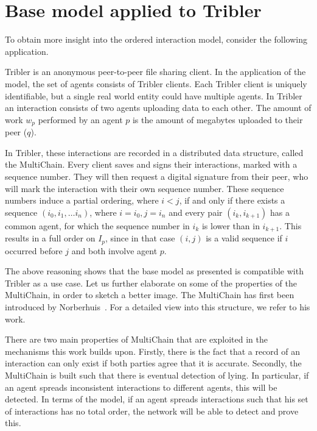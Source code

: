 \documentclass[a4paper,11pt]{book}
\theoremstyle{definition}
\begin{document}
\section{Base model applied to Tribler}
\label{sec:base_model_tribler}

To obtain more insight into the ordered interaction model, consider the following application.

Tribler is an anonymous peer-to-peer file sharing client. In the application of the model,
the set of agents consists of Tribler clients. Each Tribler client is uniquely identifiable,
but a single real world entity could have multiple agents. In Tribler an interaction
consists of two agents uploading data to each other. The amount of work $w_p$ performed
by an agent $p$ is the amount of megabytes uploaded to their peer ($q$).

In Tribler, these interactions are recorded in a distributed data structure, called the MultiChain.
Every client saves and signs their interactions, marked with a sequence number. They will then request
a digital signature from their peer, who will mark the interaction with their own sequence number.
These sequence numbers induce a partial ordering, where $i < j$, if and only if there exists
a sequence $(i_0, i_1, \ldots i_n)$, where $i=i_0, j=i_n$ and every pair $(i_k, i_{k+1})$ has
a common agent, for which the sequence number in $i_k$ is lower than in $i_{k+1}$.
This results in a full order on $I_p$, since in that case $(i, j)$ is a valid sequence if
$i$ occurred before $j$ and both involve agent $p$.

The above reasoning shows that the base model as presented is compatible with Tribler as a use case.
Let us further elaborate on some of the properties of the MultiChain, in order to sketch a better image.
The MultiChain has first been introduced by Norberhuis~\cite{norberhuis2015multichain}. For a detailed
view into this structure, we refer to his work.

There are two main properties of MultiChain that are exploited in the mechanisms this work builds upon.
Firstly, there is the fact that a record of an interaction can only exist if both parties agree that it
is accurate. Secondly, the MultiChain is built such that there is eventual detection of lying. In particular,
if an agent spreads inconsistent interactions to different agents, this will be detected. In terms of the model,
if an agent spreads interactions such that his set of interactions has no total order, the network will
be able to detect and prove this. 
\end{document}
